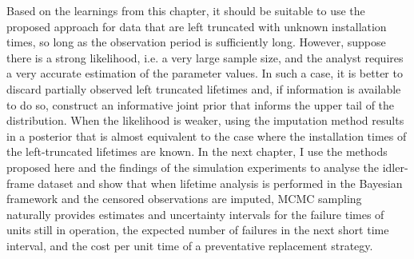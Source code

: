Based on the learnings from this chapter, it should be suitable to use the proposed approach for data that are left truncated with unknown installation times, so long as the observation period is sufficiently long. However, suppose there is a strong likelihood, i.e. a very large sample size, and the analyst requires a very accurate estimation of the parameter values. In such a case, it is better to discard partially observed left truncated lifetimes and, if information is available to do so, construct an informative joint prior that informs the upper tail of the distribution. When the likelihood is weaker, using the imputation method results in a posterior that is almost equivalent to the case where the installation times of the left-truncated lifetimes are known. In the next chapter, I use the methods proposed here and the findings of the simulation experiments to analyse the idler-frame dataset and show that when lifetime analysis is performed in the Bayesian framework and the censored observations are imputed, MCMC sampling naturally provides estimates and uncertainty intervals for the failure times of units still in operation, the expected number of failures in the next short time interval, and the cost per unit time of a preventative replacement strategy.